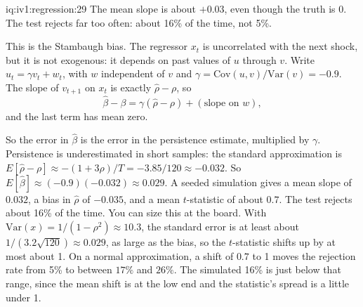 \enlargethispage{-2\baselineskip}%
\begin{solution}{iq:iv1:regression:29}
The mean slope is about $+0.03$, even though the truth is 0. The test rejects far too often: about 16\% of the time, not 5\%.

This is the Stambaugh bias. The regressor $x_t$ is uncorrelated with the next shock, but it is not exogenous: it depends on past values of $u$ through $v$. Write $u_t = \gamma v_t + w_t$, with $w$ independent of $v$ and $\gamma = \mathrm{Cov}(u, v)/\mathrm{Var}(v) = -0.9$. The slope of $v_{t+1}$ on $x_t$ is exactly $\hat\rho - \rho$, so
\[
\hat\beta - \beta = \gamma(\hat\rho - \rho) + (\text{slope on } w),
\]
and the last term has mean zero.

So the error in $\hat\beta$ is the error in the persistence estimate, multiplied by $\gamma$. Persistence is underestimated in short samples: the standard approximation is $E[\hat\rho - \rho] \approx -(1 + 3\rho)/T = -3.85/120 \approx -0.032$. So $E[\hat\beta] \approx (-0.9)(-0.032) \approx 0.029$. A seeded simulation gives a mean slope of $0.032$, a bias in $\hat\rho$ of $-0.035$, and a mean $t$-statistic of about $0.7$. The test rejects about 16\% of the time. You can size this at the board. With $\mathrm{Var}(x) = 1/(1 - \rho^2) \approx 10.3$, the standard error is at least about $1/(3.2\sqrt{120}) \approx 0.029$, as large as the bias, so the $t$-statistic shifts up by at most about 1. On a normal approximation, a shift of $0.7$ to 1 moves the rejection rate from 5\% to between $17\%$ and $26\%$. The simulated 16\% is just below that range, since the mean shift is at the low end and the statistic's spread is a little under 1.

\end{solution}

